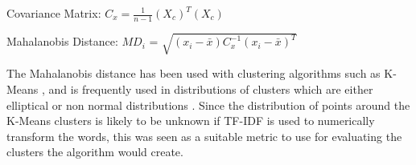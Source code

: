 \begin{center}
	Covariance Matrix:
	\boldmath$C_{x} = \frac{1}{n - 1} (X_{c}) ^T (X_{c})$
	
	Mahalanobis Distance:
	\unboldmath$MD_{i}$ = \boldmath$\sqrt{(x_{i}  -  \bar{ x  } ) C_{x}^{-1} ( x_{i}   - \bar{ x  }  )^T    }  $
\end{center}

The Mahalanobis distance has been used with clustering algorithms such as K-Means \cite{melnykov2014k} \cite{cerioli2005k}, and is frequently used in distributions of clusters which are either elliptical \cite{mitchell1985mahalanobis} or non normal distributions \cite{warren2011use}. Since the distribution of points around the K-Means clusters is likely to be unknown if TF-IDF is used to numerically transform the words, this was seen as a suitable metric to use for evaluating the clusters the algorithm would create.